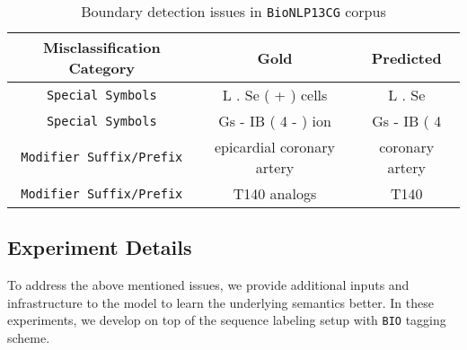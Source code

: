 \begin{itemize}
    \begin{table}[h!]
    \centering
    \begin{tabular}{|c|c|c|}\hline
    	\textbf{Misclassification Category} & \textbf{Gold} & \textbf{Predicted}\\\hline
    	\texttt{Special Symbols} & L . Se ( + ) cells & L . Se\\\hline
    	\texttt{Special Symbols} & Gs - IB ( 4 - ) ion & Gs - IB ( 4\\\hline
    	\texttt{Modifier Suffix/Prefix} & epicardial coronary artery & coronary artery\\\hline
    	\texttt{Modifier Suffix/Prefix} & T140 analogs & T140\\\hline
    	\end{tabular}
        \caption{Boundary detection issues in \texttt{BioNLP13CG} corpus}
        \label{tab:boundary_issue}
    \end{table}
\end{itemize}

\subsection{Experiment Details}

To address the above mentioned issues, we provide additional inputs and infrastructure to the model to learn the underlying semantics better. In these experiments, we develop on top of the sequence labeling setup with \texttt{BIO} tagging scheme.

